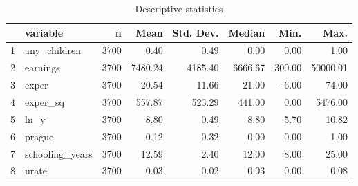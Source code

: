 \begin{table}[ht]
\centering
\caption{Descriptive statistics} 
\begin{tabular}{rlrrrrrr}
  \hline
 & variable & n & Mean & Std. Dev. & Median & Min. & Max. \\ 
  \hline
1 & any\_children & 3700 & 0.40 & 0.49 & 0.00 & 0.00 & 1.00 \\ 
  2 & earnings & 3700 & 7480.24 & 4185.40 & 6666.67 & 300.00 & 50000.01 \\ 
  3 & exper & 3700 & 20.54 & 11.66 & 21.00 & -6.00 & 74.00 \\ 
  4 & exper\_sq & 3700 & 557.87 & 523.29 & 441.00 & 0.00 & 5476.00 \\ 
  5 & ln\_y & 3700 & 8.80 & 0.49 & 8.80 & 5.70 & 10.82 \\ 
  6 & prague & 3700 & 0.12 & 0.32 & 0.00 & 0.00 & 1.00 \\ 
  7 & schooling\_years & 3700 & 12.59 & 2.40 & 12.00 & 8.00 & 25.00 \\ 
  8 & urate & 3700 & 0.03 & 0.02 & 0.03 & 0.00 & 0.08 \\ 
   \hline
\end{tabular}
\end{table}
